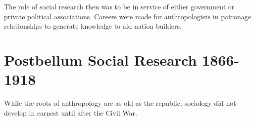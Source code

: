 \documentclass[]{book}
\begin{document}
The role of social research then was to be in service of either
government or private political associations. Careers were made for
anthropologists in patronage relationships to generate knowledge to aid
nation builders.

\section{Postbellum Social Research
1866-1918}\label{postbellum-social-research-1866-1918}

While the roots of anthropology are as old as the republic, sociology
did not develop in earnest until after the Civil War.


\end{document}
